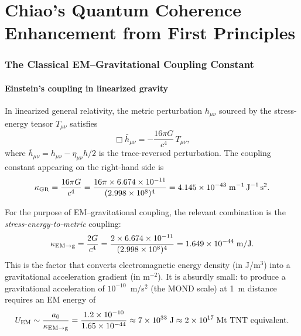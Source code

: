 \documentclass[12pt,aps,prd,twocolumn,superscriptaddress,nofootinbib]{revtex4-2}
\newcommand{\ee}[1]{\times 10^{#1}}
\begin{document}
\maketitle
\tableofcontents

\part{Chiao's Quantum Coherence Enhancement from First Principles}

\section{The Classical EM--Gravitational Coupling Constant}
\label{sec:classical}

\subsection{Einstein's coupling in linearized gravity}

In linearized general relativity, the metric perturbation $h_{\mu\nu}$
sourced by the stress-energy tensor $T_{\mu\nu}$ satisfies
\begin{equation}\label{eq:linearized-GR}
\Box \bar{h}_{\mu\nu} = -\frac{16\pi G}{c^4}\,T_{\mu\nu},
\end{equation}
where $\bar{h}_{\mu\nu} = h_{\mu\nu} - \eta_{\mu\nu}h/2$ is the
trace-reversed perturbation. The coupling constant appearing on the
right-hand side is
\begin{equation}\label{eq:kappa-GR}
\kappa_{\rm GR} = \frac{16\pi G}{c^4}
= \frac{16\pi \times 6.674\ee{-11}}{(2.998\ee{8})^4}
= 4.145\ee{-43}\;\si{m^{-1}\,J^{-1}\,s^2}.
\end{equation}

For the purpose of EM--gravitational coupling, the relevant
combination is the \emph{stress-energy-to-metric} coupling:
\begin{equation}\label{eq:kappa-EM}
\kappa_{\rm EM\to g} = \frac{2G}{c^4}
= \frac{2 \times 6.674\ee{-11}}{(2.998\ee{8})^4}
= 1.649\ee{-44}\;\si{m/J}.
\end{equation}
This is the factor that converts electromagnetic energy density
(in J/m$^3$) into a gravitational acceleration gradient (in m$^{-2}$).
It is absurdly small: to produce a gravitational acceleration of
$10^{-10}$~m/s$^2$ (the MOND scale) at 1~m distance requires
an EM energy of
\begin{equation}
U_{\rm EM} \sim \frac{a_0}{\kappa_{\rm EM\to g}}
= \frac{1.2\ee{-10}}{1.65\ee{-44}}
\approx 7\ee{33}\;\si{J}
\approx 2\ee{17}\;\text{Mt TNT equivalent}.
\end{equation}
\end{document}
